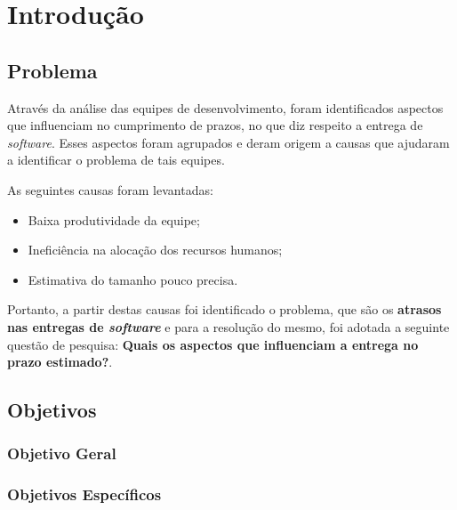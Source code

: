 \chapter[Introdução]{Introdução}

\section{Problema}

Através da análise das equipes de desenvolvimento, foram identificados aspectos que influenciam no cumprimento de prazos, 
no que diz respeito a entrega de \textit{software}. Esses aspectos foram agrupados e deram origem a causas que ajudaram  a 
identificar o problema de tais equipes.

As seguintes causas foram levantadas:
\begin{itemize}
 \item Baixa produtividade da equipe;
 \item Ineficiência na alocação dos recursos humanos;
 \item Estimativa do tamanho pouco precisa.
\end{itemize}

Portanto, a partir destas causas foi identificado o problema, que são os \textbf{atrasos nas entregas de \textit{software}} 
e para a resolução do mesmo, foi adotada a seguinte questão de pesquisa: \textbf{Quais os aspectos que influenciam a 
entrega no prazo estimado?}.

\vfill
\pagebreak
  
\section{Objetivos}

\subsection{Objetivo Geral}

\subsection{Objetivos Específicos}

